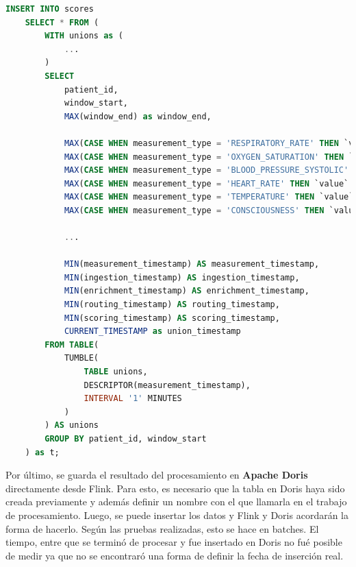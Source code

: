 \begin{lstlisting}[language=sql]
    INSERT INTO scores
    SELECT * FROM (
        WITH unions as (
            ...
        )
        SELECT 
            patient_id,
            window_start,
            MAX(window_end) as window_end,

            MAX(CASE WHEN measurement_type = 'RESPIRATORY_RATE' THEN `value` END) as respiratory_rate_value,
            MAX(CASE WHEN measurement_type = 'OXYGEN_SATURATION' THEN `value` END) as oxygen_saturation_value,
            MAX(CASE WHEN measurement_type = 'BLOOD_PRESSURE_SYSTOLIC' THEN `value` END) as blood_pressure_value,
            MAX(CASE WHEN measurement_type = 'HEART_RATE' THEN `value` END) as heart_rate_value,
            MAX(CASE WHEN measurement_type = 'TEMPERATURE' THEN `value` END) as temperature_value,
            MAX(CASE WHEN measurement_type = 'CONSCIOUSNESS' THEN `value` END) as consciousness_value,

            ...

            MIN(measurement_timestamp) AS measurement_timestamp,
            MIN(ingestion_timestamp) AS ingestion_timestamp,
            MIN(enrichment_timestamp) AS enrichment_timestamp,
            MIN(routing_timestamp) AS routing_timestamp,
            MIN(scoring_timestamp) AS scoring_timestamp,
            CURRENT_TIMESTAMP as union_timestamp
        FROM TABLE(
            TUMBLE(
                TABLE unions, 
                DESCRIPTOR(measurement_timestamp), 
                INTERVAL '1' MINUTES
            )
        ) AS unions 
        GROUP BY patient_id, window_start
    ) as t;
\end{lstlisting}

Por último, se guarda el resultado del procesamiento en \textbf{Apache Doris} directamente desde Flink.
Para esto, es necesario que la tabla en Doris haya sido creada previamente y además definir un nombre con el que llamarla en el trabajo de procesamiento.
Luego, se puede insertar los datos y Flink y Doris acordarán la forma de hacerlo. Según las pruebas realizadas, esto se hace en batches. 
El tiempo, entre que se terminó de procesar y fue insertado en Doris no fué posible de medir ya que no se encontraró una forma de definir la fecha de inserción real.

\newpage

